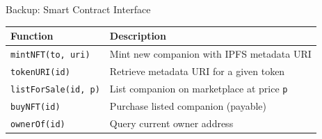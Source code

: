 \documentclass[aspectratio=169, 10pt]{beamer}
\begin{document}
\begin{frame}{Backup: Smart Contract Interface}
  \centering
  \vspace{0.1cm}
  \begin{tabular}{@{} l p{7.2cm} @{}}
    \toprule
    \textbf{Function} & \textbf{Description} \\
    \midrule
    \texttt{mintNFT(to, uri)}     & Mint new companion with IPFS metadata URI \\
    \texttt{tokenURI(id)}         & Retrieve metadata URI for a given token \\
    \texttt{listForSale(id, p)}   & List companion on marketplace at price \texttt{p} \\
    \texttt{buyNFT(id)}           & Purchase listed companion (payable) \\
    \texttt{ownerOf(id)}          & Query current owner address \\
    \bottomrule
  \end{tabular}
\end{frame}
\end{document}
